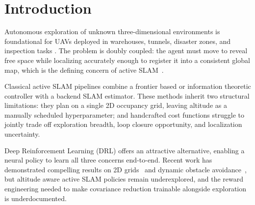 \documentclass[runningheads]{llncs}
\begin{document}
\section{Introduction}

Autonomous exploration of unknown three-dimensional environments is foundational for UAVs deployed in warehouses, tunnels, disaster zones, and inspection tasks \cite{qin2019autonomous,zhang2026adaptive}. The problem is doubly coupled: the agent must move to reveal free space while localizing accurately enough to register it into a consistent global map, which is the defining concern of active SLAM~\cite{placed2023survey,zhang2026u}.

Classical active SLAM pipelines combine a frontier based or information theoretic controller with a backend SLAM estimator. These methods inherit two structural limitations: they plan on a single 2D occupancy grid, leaving altitude as a manually scheduled hyperparameter; and handcrafted cost functions struggle to jointly trade off exploration breadth, loop closure opportunity, and localization uncertainty.

Deep Reinforcement Learning (DRL) offers an attractive alternative, enabling a neural policy to learn all three concerns end-to-end. Recent work has demonstrated compelling results on 2D grids~\cite{yin2025maslam,chen2024lidar,zhao2024ddpg} and dynamic obstacle avoidance~\cite{xu2025navrl}, but altitude aware active SLAM policies remain underexplored, and the reward engineering needed to make covariance reduction trainable alongside exploration is underdocumented.
\end{document}
